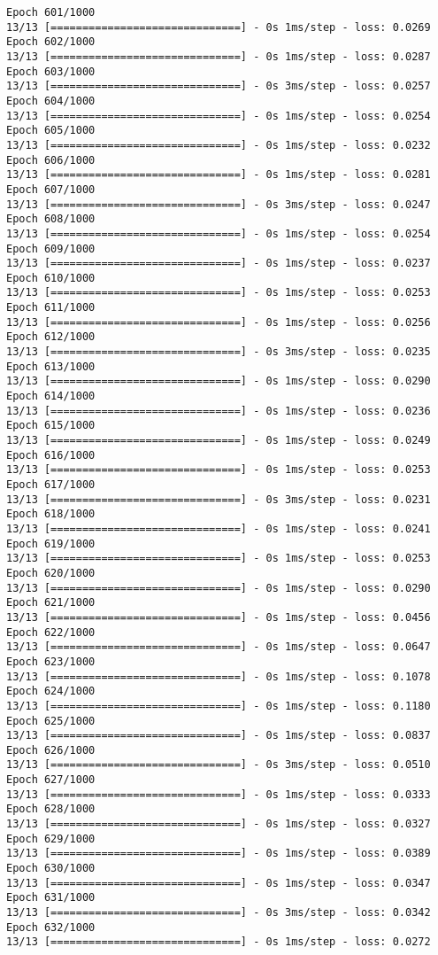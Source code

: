 \documentclass[11pt]{article}
\begin{document}
\begin{Verbatim}[commandchars=\\\{\}]
Epoch 601/1000
13/13 [==============================] - 0s 1ms/step - loss: 0.0269
Epoch 602/1000
13/13 [==============================] - 0s 1ms/step - loss: 0.0287
Epoch 603/1000
13/13 [==============================] - 0s 3ms/step - loss: 0.0257
Epoch 604/1000
13/13 [==============================] - 0s 1ms/step - loss: 0.0254
Epoch 605/1000
13/13 [==============================] - 0s 1ms/step - loss: 0.0232
Epoch 606/1000
13/13 [==============================] - 0s 1ms/step - loss: 0.0281
Epoch 607/1000
13/13 [==============================] - 0s 3ms/step - loss: 0.0247
Epoch 608/1000
13/13 [==============================] - 0s 1ms/step - loss: 0.0254
Epoch 609/1000
13/13 [==============================] - 0s 1ms/step - loss: 0.0237
Epoch 610/1000
13/13 [==============================] - 0s 1ms/step - loss: 0.0253
Epoch 611/1000
13/13 [==============================] - 0s 1ms/step - loss: 0.0256
Epoch 612/1000
13/13 [==============================] - 0s 3ms/step - loss: 0.0235
Epoch 613/1000
13/13 [==============================] - 0s 1ms/step - loss: 0.0290
Epoch 614/1000
13/13 [==============================] - 0s 1ms/step - loss: 0.0236
Epoch 615/1000
13/13 [==============================] - 0s 1ms/step - loss: 0.0249
Epoch 616/1000
13/13 [==============================] - 0s 1ms/step - loss: 0.0253
Epoch 617/1000
13/13 [==============================] - 0s 3ms/step - loss: 0.0231
Epoch 618/1000
13/13 [==============================] - 0s 1ms/step - loss: 0.0241
Epoch 619/1000
13/13 [==============================] - 0s 1ms/step - loss: 0.0253
Epoch 620/1000
13/13 [==============================] - 0s 1ms/step - loss: 0.0290
Epoch 621/1000
13/13 [==============================] - 0s 1ms/step - loss: 0.0456
Epoch 622/1000
13/13 [==============================] - 0s 1ms/step - loss: 0.0647
Epoch 623/1000
13/13 [==============================] - 0s 1ms/step - loss: 0.1078
Epoch 624/1000
13/13 [==============================] - 0s 1ms/step - loss: 0.1180
Epoch 625/1000
13/13 [==============================] - 0s 1ms/step - loss: 0.0837
Epoch 626/1000
13/13 [==============================] - 0s 3ms/step - loss: 0.0510
Epoch 627/1000
13/13 [==============================] - 0s 1ms/step - loss: 0.0333
Epoch 628/1000
13/13 [==============================] - 0s 1ms/step - loss: 0.0327
Epoch 629/1000
13/13 [==============================] - 0s 1ms/step - loss: 0.0389
Epoch 630/1000
13/13 [==============================] - 0s 1ms/step - loss: 0.0347
Epoch 631/1000
13/13 [==============================] - 0s 3ms/step - loss: 0.0342
Epoch 632/1000
13/13 [==============================] - 0s 1ms/step - loss: 0.0272

\end{Verbatim}
\end{document}
